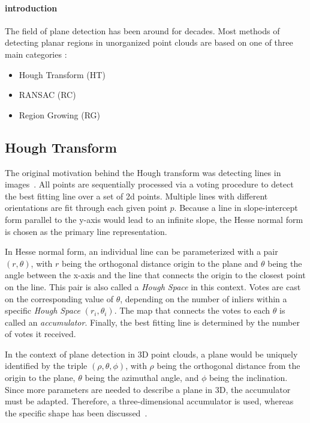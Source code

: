 \documentclass[main.tex]{subfiles}
\begin{document}
\paragraph*{introduction}
The field of plane detection has been around for decades.
Most methods of detecting planar regions in unorganized point clouds are based on one of three main categories \cite*{Limberger_Oliveira_2015,Araújo_Oliveira_2020}:
\begin{itemize}
    \item Hough Transform (HT)
    \item RANSAC (RC)
    \item Region Growing (RG)
\end{itemize}

\subsection*{Hough Transform}
The original motivation behind the Hough transform was detecting lines in images~\cite{5230799}. All points are sequentially processed via a voting procedure to detect the best fitting line over a set of 2d points.
Multiple lines with different orientations are fit through each given point $p$.
Because a line in slope-intercept form parallel to the y-axis would lead to an infinite slope, the Hesse normal form is chosen as the primary line representation\cite{10.1145/361237.361242}.

In Hesse normal form, an individual line can be parameterized with a pair $(r, \theta)$, with $r$  being the orthogonal distance origin to the plane and $\theta$ being the angle between the x-axis and the line that connects the origin to the closest point on the line.
This pair is also called a \textit{Hough Space} in this context. Votes are cast on the corresponding value of $\theta$, depending on the number of inliers within a specific \textit{Hough Space} $(r_i,\theta_i)$. The map that connects the
votes to each $\theta$ is called an \textit{accumulator}.
Finally, the best fitting line is determined by the number of votes it received.

In the context of plane detection in 3D point clouds, a plane would be uniquely identified by the triple $(\rho, \theta, \phi)$, with $\rho$ being the orthogonal distance from the origin to the plane, $\theta$ being the azimuthal angle, and $\phi$ being the inclination.
Since more parameters are needed to describe a plane in 3D, the accumulator must be adapted.
Therefore, a three-dimensional accumulator is used, whereas the specific shape has been discussed~\cite*{Borrmann_Elseberg_Lingemann_Nüchter_2011}.
\end{document}
